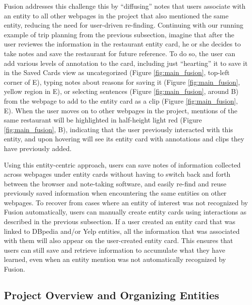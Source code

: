 Fusion addresses this challenge this by ``diffusing'' notes that users associate with an entity to all other webpages in the project that also mentioned the same entity, reducing the need for user-driven re-finding. Continuing with our running example of trip planning from the previous subsection, imagine that after the user reviewes the information in the restaurant entity card, he or she decides to take notes and save the restaurant for future reference. To do so, the user can add various levels of annotation to the card, including just ``hearting'' it to save it in the Saved Cards view as uncategorized  (Figure \ref{fig:main_fusion}, top-left corner of E), typing notes about reasons for saving it (Figure \ref{fig:main_fusion}, yellow region in E), or selecting sentences (Figure \ref{fig:main_fusion}, around B) from the webpage to add to the entity card as a clip (Figure \ref{fig:main_fusion}, E). When the user moves on to other webpages in the project, mentions of the same restaurant will be highlighted in half-height light red (Figure \ref{fig:main_fusion}, B), indicating that the user previously interacted with this entity, and upon hovering will see its entity card with annotations and clips they have previously added. 

Using this entity-centric approach, users can save notes of information collected across webpages under entity cards without having to switch back and forth between the browser and note-taking software, and easily re-find and reuse previously saved information when encountering the same entities on other webpages. To recover from cases where an entity of interest was not recognized by Fusion automatically, users can manually create entity cards using interactions as described in the previous subsection. If a user created an entity card that was linked to DBpedia and/or Yelp entities, all the information that was associated with them will also appear on the user-created entity card. This ensures that users can still save and retrieve information to accumulate what they have learned, even when an entity mention was not automatically recognized by Fusion.

\subsection{Project Overview and Organizing Entities}

